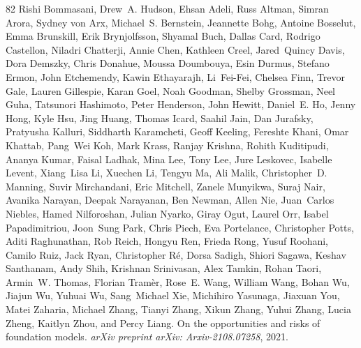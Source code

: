 \documentclass{article}
\begin{document}
\begin{thebibliography}{82}
Rishi Bommasani, Drew~A. Hudson, Ehsan Adeli, Russ Altman, Simran Arora, Sydney von Arx, Michael~S. Bernstein, Jeannette Bohg, Antoine Bosselut, Emma Brunskill, Erik Brynjolfsson, Shyamal Buch, Dallas Card, Rodrigo Castellon, Niladri Chatterji, Annie Chen, Kathleen Creel, Jared~Quincy Davis, Dora Demszky, Chris Donahue, Moussa Doumbouya, Esin Durmus, Stefano Ermon, John Etchemendy, Kawin Ethayarajh, Li~Fei-Fei, Chelsea Finn, Trevor Gale, Lauren Gillespie, Karan Goel, Noah Goodman, Shelby Grossman, Neel Guha, Tatsunori Hashimoto, Peter Henderson, John Hewitt, Daniel~E. Ho, Jenny Hong, Kyle Hsu, Jing Huang, Thomas Icard, Saahil Jain, Dan Jurafsky, Pratyusha Kalluri, Siddharth Karamcheti, Geoff Keeling, Fereshte Khani, Omar Khattab, Pang~Wei Koh, Mark Krass, Ranjay Krishna, Rohith Kuditipudi, Ananya Kumar, Faisal Ladhak, Mina Lee, Tony Lee, Jure Leskovec, Isabelle Levent, Xiang~Lisa Li, Xuechen Li, Tengyu Ma, Ali Malik, Christopher~D. Manning, Suvir Mirchandani, Eric Mitchell, Zanele Munyikwa, Suraj Nair,
  Avanika Narayan, Deepak Narayanan, Ben Newman, Allen Nie, Juan~Carlos Niebles, Hamed Nilforoshan, Julian Nyarko, Giray Ogut, Laurel Orr, Isabel Papadimitriou, Joon~Sung Park, Chris Piech, Eva Portelance, Christopher Potts, Aditi Raghunathan, Rob Reich, Hongyu Ren, Frieda Rong, Yusuf Roohani, Camilo Ruiz, Jack Ryan, Christopher Ré, Dorsa Sadigh, Shiori Sagawa, Keshav Santhanam, Andy Shih, Krishnan Srinivasan, Alex Tamkin, Rohan Taori, Armin~W. Thomas, Florian Tramèr, Rose~E. Wang, William Wang, Bohan Wu, Jiajun Wu, Yuhuai Wu, Sang~Michael Xie, Michihiro Yasunaga, Jiaxuan You, Matei Zaharia, Michael Zhang, Tianyi Zhang, Xikun Zhang, Yuhui Zhang, Lucia Zheng, Kaitlyn Zhou, and Percy Liang.
\newblock On the opportunities and risks of foundation models.
\newblock \emph{arXiv preprint arXiv: Arxiv-2108.07258}, 2021.


\end{thebibliography}
\end{document}
